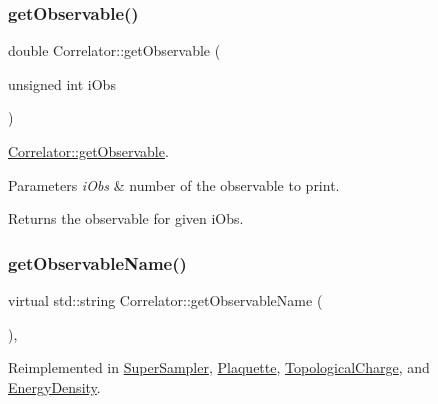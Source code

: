 \mbox{\label{class_correlator_aada8184c033e0465f540a368465c9ba5}} 
\subsubsection{\texorpdfstring{getObservable()}{getObservable()}}
{\footnotesize\ttfamily double Correlator\+::get\+Observable (\begin{DoxyParamCaption}\item[{unsigned int}]{i\+Obs }\end{DoxyParamCaption})\hspace{0.3cm}{\ttfamily [virtual]}}



\mbox{\hyperlink{class_correlator_aada8184c033e0465f540a368465c9ba5}{Correlator\+::get\+Observable}}. 


\begin{DoxyParams}{Parameters}
{\em i\+Obs} & number of the observable to print. \\
\hline
\end{DoxyParams}
\begin{DoxyReturn}{Returns}
the observable for given i\+Obs. 
\end{DoxyReturn}
\mbox{\label{class_correlator_ad1fa59e864917c3e48da037f90c3488f}} 
\subsubsection{\texorpdfstring{getObservableName()}{getObservableName()}}
{\footnotesize\ttfamily virtual std\+::string Correlator\+::get\+Observable\+Name (\begin{DoxyParamCaption}{ }\end{DoxyParamCaption})\hspace{0.3cm}{\ttfamily [inline]}, {\ttfamily [virtual]}}



Reimplemented in \mbox{\hyperlink{class_super_sampler_a84d3ba9a56dd2a36cb11d495c32f5ca6}{Super\+Sampler}}, \mbox{\hyperlink{class_plaquette_a86de9d267ae1bc6a8c6d3335837ea683}{Plaquette}}, \mbox{\hyperlink{class_topological_charge_ad12d246692f3d9ea0ef591814010ef88}{Topological\+Charge}}, and \mbox{\hyperlink{class_energy_density_a59b320595bca439333d36e3753ca07f0}{Energy\+Density}}.

